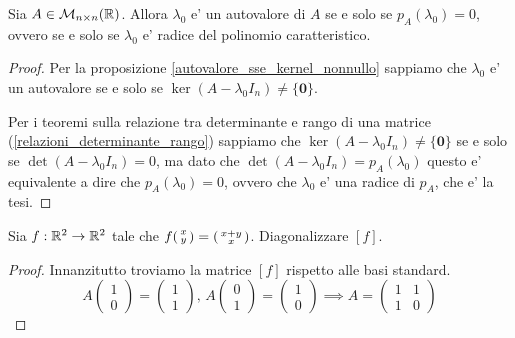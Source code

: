\begin{theorem}
    Sia $A \in \mathcal{M}_{n \times n}(\mathbb{R})$. Allora $\lambda_0$ e' un autovalore di $A$ se e solo se $p_A(\lambda_0) = 0$, ovvero se e solo se $\lambda_0$ e' radice del polinomio caratteristico.
\end{theorem}
\begin{proof}
    Per la proposizione \ref{autovalore_sse_kernel_nonnullo} sappiamo che $\lambda_0$ e' un autovalore se e solo se $\ker (A - \lambda_0 I_n) \neq \{\bm 0\}$.  
    
    Per i teoremi sulla relazione tra determinante e rango di una matrice (\ref{relazioni_determinante_rango}) sappiamo che $\ker (A - \lambda_0 I_n) \neq \{\bm 0\}$ se e solo se $\det (A - \lambda_0 I_n) = 0$, ma dato che $\det (A - \lambda_0 I_n) = p_A(\lambda_0)$ questo e' equivalente a dire che $p_A(\lambda_0) = 0$, ovvero che $\lambda_0$ e' una radice di $p_A$, che e' la tesi.
\end{proof}

\begin{example}
    Sia $f : \mathbb{R}^2 \to \mathbb{R}^2$ tale che $f\begin{psmallmatrix} x \\ y \end{psmallmatrix} = \begin{psmallmatrix} x + y \\ x \end{psmallmatrix}$. Diagonalizzare $[f]$.
\end{example}
\begin{proof}
    Innanzitutto troviamo la matrice $[f]$ rispetto alle basi standard.
    \begin{equation*}
        A\begin{pmatrix} 1 \\ 0 \end{pmatrix} = \begin{pmatrix} 1 \\ 1 \end{pmatrix},
            \,A\begin{pmatrix} 0 \\ 1 \end{pmatrix} = \begin{pmatrix} 1 \\ 0 \end{pmatrix}
        \implies A = \begin{pmatrix}
            1 & 1 \\ 1 & 0
        \end{pmatrix}
    \end{equation*}
\end{proof}